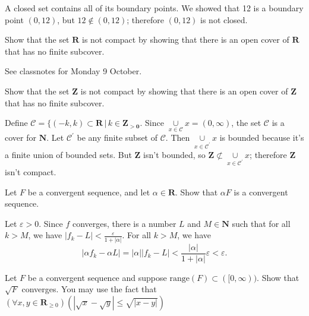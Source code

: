 \documentclass[12pt, fleqn, answers]{exam}
\newcommand{\reals}{\mathbf{R}}
\newcommand{\integers}{\mathbf{Z}}
\newcommand{\range}{\mathrm{range}}
\begin{document}
\begin{questions}
\begin{solution}%
A closed set contains all of its boundary points. We showed that 12 is a boundary point \((0,12)\), but
\(12 \notin (0,12)\); therefore \((0,12)\) is not closed.
\end{solution}


\question  Show that the set \(\reals\) is not compact by 
showing that there is an open cover of \( \reals \) that has no
finite subcover.

\begin{solution} See classnotes for Monday 9 October.

\end{solution}

\question  Show that the set \(\mathbf{Z}\) is not compact by 
showing that there is an open cover of \( \mathbf{Z} \) that has no
finite subcover.

\begin{solution}%
  Define \(\mathcal{C} = \{(-k,k) \subset \reals \, | \, k \in \mathbf{\integers_{>0}}\). Since 
  \(\underset{x \in \mathcal{C}}{\cup} x = (0,\infty)\), the set \(\mathcal{C}\)
is a cover for  \(\mathbf{N}\). Let  \(\mathcal{C}^\prime\) be any finite subset
of  \(\mathcal{C}\). Then \(\underset{x \in \mathcal{C}^\prime}{\cup} x\) is
bounded because it's a finite union of bounded sets.  But \(\mathbf{\integers}\) isn't
bounded, so \(\mathbf{\integers} \not \subset \underset{x \in \mathcal{C}^\prime}{\cup} x\);
therefore \(\mathbf{\integers}\) isn't compact.
\end{solution}


\question Let \(F\) be a convergent sequence, and let \(\alpha \in
\reals\).  Show that \(\alpha F\) is a convergent sequence.



\begin{solution}%
Let \(\varepsilon > 0\). Since \(f\) converges, there is a number \(L\) and 
\(M \in \mathbf{N}\) such that for all \(k > M\), we have \(|f_k - L| < \frac{\varepsilon}{1 + |\alpha|}\).
For all \(k > M\), we have
\[
  |\alpha f_k - \alpha L| = |\alpha| |f_k - L|
                          < \frac{ |\alpha|}{1 + |\alpha|} \varepsilon
                          < \varepsilon.
\]

\end{solution}

\question Let $F$ be a convergent sequence and suppose $\range(F) \subset([0,\infty))$. Show that $\sqrt{F}$ converges.
You may use the fact that $\left(\forall x,y \in \reals_{\geq 0}\right)  (| \sqrt{x} - \sqrt{y} | \leq \sqrt{|x - y|} )$


\end{questions}
\end{document}
